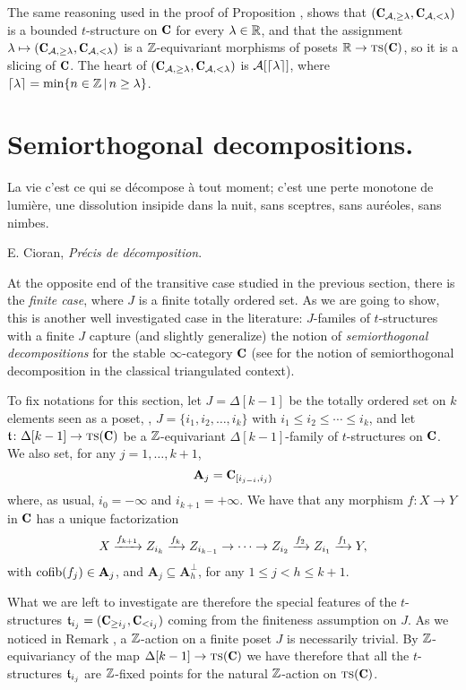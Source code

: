 \documentclass[a4paper,12pt]{amsart}
\begin{document}
\begin{remark}The same reasoning used in the proof of Proposition , shows that $(\C_{\A,\geq \lambda}, \C_{\A,<\lambda})$ is a bounded $t$-structure on $\C$ for every $\lambda\in \mathbb{R}$, and that the assignment $\lambda\mapsto (\C_{\A,\geq \lambda}, \C_{\A,<\lambda})$ is a $\mathbb{Z}$-equivariant morphisms of posets $\R\to \textsc{ts}(\C)$, so it is a slicing of $\C$. The heart of $(\C_{\A,\geq \lambda}, \C_{\A,<\lambda})$ is $\mathcal{A}[\left \lceil{\lambda}\right \rceil]$, where $\left \lceil{\lambda}\right \rceil=\min\{n\in \mathbb{Z}\,|\, n\geq\lambda\}$.
\end{remark}
\section{Semiorthogonal decompositions.}
\setlength{\epigraphwidth}{.75\textwidth}
\epigraph{La vie c'est ce qui se décompose à tout moment; c'est une perte monotone de lumière, une dissolution insipide dans la nuit, sans sceptres, sans auréoles, sans nimbes.}{E. Cioran, \emph{Pr\'ecis de décomposition}.}
\setlength{\epigraphwidth}{\DefaultEpigraphWidth}
At the opposite end of the transitive case studied in the previous section, there is the \emph{finite case}, where $J$ is a finite totally ordered set. As we are going to show, this is another well investigated case in the literature: $J$-familes of $t$-structures with a finite $J$ capture (and slightly generalize) the notion of \emph{semiorthogonal decompositions} for the stable $\infty$-category $\C$ (see \cite{Bondal1995, Kuz} for the notion of semiorthogonal decomposition in the classical triangulated context).

To fix notations for this section, let $J=\Delta[k-1]$ be the totally ordered set on $k$ elements seen as a poset, \ie, $J=\{i_1,i_2,\dots,i_k\}$ with $i_1\leq i_2\leq\cdots\leq i_k$, and let $\tee\colon \Delta[k-1]\to \ts(\C)$ be a $\mathbb{Z} $-equivariant $\Delta[k-1]$-family of $t$-structures on $\C$. We also set, for any $j=1,\dots,k+1$,
\[
\mathbf{A}_j=\C_{[i_{j-i}, i_j)}
\]
where, as usual, $i_0=-\infty$ and $i_{k+1}=+\infty$. We have that any morphism $f\colon X\to Y$ in $\C$ has a unique factorization
\[
X \xrightarrow{f_{k+1}} Z_{i_k} \xrightarrow{f_k}Z_{i_{k-1}}\to\dots\to Z_{i_{2}} \xrightarrow{f_2} Z_{i_1} \xrightarrow{f_1} Y,
\]
with $\operatorname{cofib}(f_j)\in \mathbf{A}_j$, and $\mathbf{A}_j\subseteq \mathbf{A}_h^\perp$, for any $1\leq j <h\leq k+1$. 

What we are left to investigate are therefore the special features of the $t$-structures $\tee_{i_j}=(\C_{\geq i_j},\C_{< i_j})$ coming from the finiteness assumption on $J$.
As we noticed in Remark , a $\mathbb{Z} $-action on a finite poset $J$ is necessarily trivial. By $\mathbb{Z} $-equivariancy of the map $\Delta[k-1]\to \ts(\C)$ we have therefore that all the $t$-structures $\mathfrak{t}_{i_j}$ are $\mathbb{Z} $-fixed points for the natural $\mathbb{Z} $-action on $ \ts(\C)$. 
\end{document}
